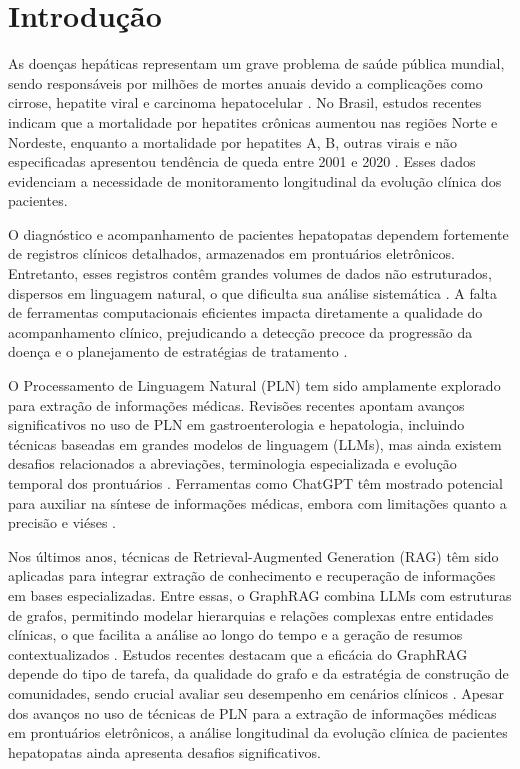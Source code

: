 \chapter{Introdução}\label{cap:introducao}

As doenças hepáticas representam um grave problema de saúde pública mundial, sendo responsáveis por milhões de mortes anuais devido a complicações como cirrose, hepatite viral e carcinoma hepatocelular \citep{sousa2023}. No Brasil, estudos recentes indicam que a mortalidade por hepatites crônicas aumentou nas regiões Norte e Nordeste, enquanto a mortalidade por hepatites A, B, outras virais e não especificadas apresentou tendência de queda entre 2001 e 2020 \citep{sousa2023}. Esses dados evidenciam a necessidade de monitoramento longitudinal da evolução clínica dos pacientes.

O diagnóstico e acompanhamento de pacientes hepatopatas dependem fortemente de registros clínicos detalhados, armazenados em prontuários eletrônicos. Entretanto, esses registros contêm grandes volumes de dados não estruturados, dispersos em linguagem natural, o que dificulta sua análise sistemática \citep{schneider2023}. A falta de ferramentas computacionais eficientes impacta diretamente a qualidade do acompanhamento clínico, prejudicando a detecção precoce da progressão da doença e o planejamento de estratégias de tratamento \citep{hou2014}.

O Processamento de Linguagem Natural (PLN) tem sido amplamente explorado para extração de informações médicas. Revisões recentes apontam avanços significativos no uso de PLN em gastroenterologia e hepatologia, incluindo técnicas baseadas em grandes modelos de linguagem (LLMs), mas ainda existem desafios relacionados a abreviações, terminologia especializada e evolução temporal dos prontuários \citep{stammers2025,shahab2024}. Ferramentas como ChatGPT têm mostrado potencial para auxiliar na síntese de informações médicas, embora com limitações quanto a precisão e viéses \citep{dave2023}.

Nos últimos anos, técnicas de Retrieval-Augmented Generation (RAG)\citep{gao2024} têm sido aplicadas para integrar extração de conhecimento e recuperação de informações em bases especializadas. Entre essas, o GraphRAG combina LLMs com estruturas de grafos, permitindo modelar hierarquias e relações complexas entre entidades clínicas, o que facilita a análise ao longo do tempo e a geração de resumos contextualizados \citep{edge2024,xiang2025}. Estudos recentes destacam que a eficácia do GraphRAG depende do tipo de tarefa, da qualidade do grafo e da estratégia de construção de comunidades, sendo crucial avaliar seu desempenho em cenários clínicos \citep{xiang2025}. Apesar dos avanços no uso de técnicas de  PLN para a extração de informações médicas em prontuários eletrônicos, a análise longitudinal da evolução clínica de pacientes hepatopatas ainda apresenta desafios significativos.

